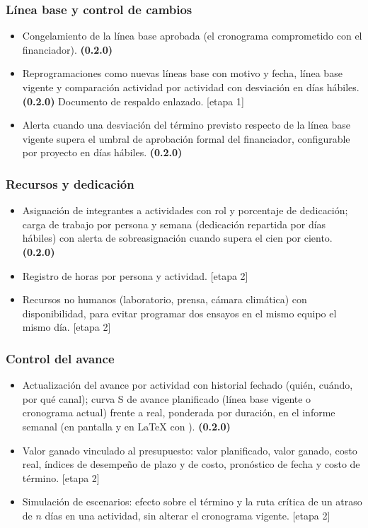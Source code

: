 \documentclass[11pt,a4paper]{article}
\newcommand{\etapa}[1]{\textcolor{grismedio}{[etapa #1]}}
\begin{document}
\subsubsection{Línea base y control de cambios}
\begin{itemize}
\item Congelamiento de la línea base aprobada (el cronograma comprometido con el financiador). \textbf{(0.2.0)}
\item Reprogramaciones como nuevas líneas base con motivo y fecha, línea base vigente y comparación actividad por actividad con desviación en días hábiles. \textbf{(0.2.0)} Documento de respaldo enlazado. \etapa{1}
\item Alerta cuando una desviación del término previsto respecto de la línea base vigente supera el umbral de aprobación formal del financiador, configurable por proyecto en días hábiles. \textbf{(0.2.0)}
\end{itemize}

\subsubsection{Recursos y dedicación}
\begin{itemize}
\item Asignación de integrantes a actividades con rol y porcentaje de dedicación; carga de trabajo por persona y semana (dedicación repartida por días hábiles) con alerta de sobreasignación cuando supera el cien por ciento. \textbf{(0.2.0)}
\item Registro de horas por persona y actividad. \etapa{2}
\item Recursos no humanos (laboratorio, prensa, cámara climática) con disponibilidad, para evitar programar dos ensayos en el mismo equipo el mismo día. \etapa{2}
\end{itemize}

\subsubsection{Control del avance}
\begin{itemize}
\item Actualización del avance por actividad con historial fechado (quién, cuándo, por qué canal); curva S de avance planificado (línea base vigente o cronograma actual) frente a real, ponderada por duración, en el informe semanal (en pantalla y en LaTeX con ). \textbf{(0.2.0)}
\item Valor ganado vinculado al presupuesto: valor planificado, valor ganado, costo real, índices de desempeño de plazo y de costo, pronóstico de fecha y costo de término. \etapa{2}
\item Simulación de escenarios: efecto sobre el término y la ruta crítica de un atraso de $n$ días en una actividad, sin alterar el cronograma vigente. \etapa{2}
\end{itemize}
\end{document}
